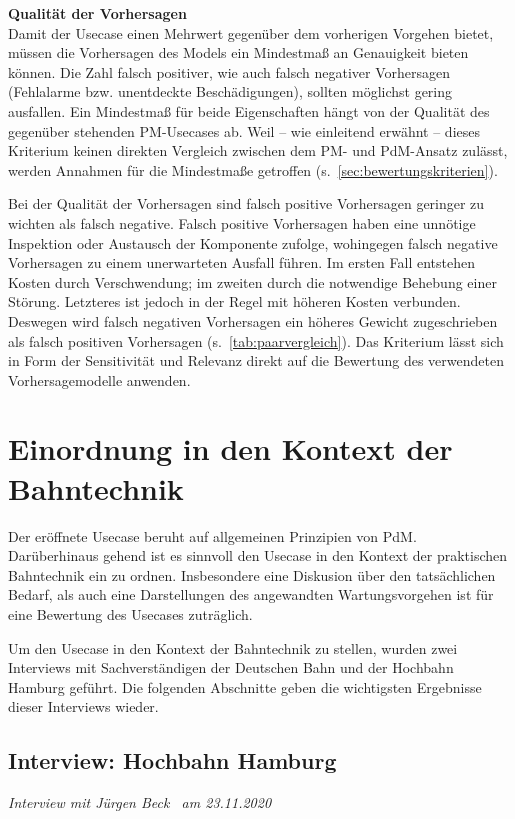 \textbf{Qualität der Vorhersagen}\\
Damit der Usecase einen Mehrwert gegenüber dem vorherigen Vorgehen bietet, müssen die Vorhersagen des Models ein Mindestmaß an Genauigkeit bieten können. Die Zahl falsch positiver, wie auch falsch negativer Vorhersagen (Fehlalarme bzw. unentdeckte Beschädigungen), sollten möglichst gering ausfallen. Ein Mindestmaß für beide Eigenschaften hängt von der Qualität des gegenüber stehenden PM-Usecases ab. Weil -- wie einleitend erwähnt -- dieses Kriterium keinen direkten Vergleich zwischen dem PM- und PdM-Ansatz zulässt, werden Annahmen für die Mindestmaße getroffen (s.~\cref{sec:bewertungskriterien}).

Bei der Qualität der Vorhersagen sind falsch positive Vorhersagen geringer zu wichten als falsch negative. Falsch positive Vorhersagen haben eine unnötige Inspektion oder Austausch der Komponente zufolge, wohingegen falsch negative Vorhersagen zu einem unerwarteten Ausfall führen. Im ersten Fall entstehen Kosten durch Verschwendung; im zweiten durch die notwendige Behebung einer Störung. Letzteres ist jedoch in der Regel mit höheren Kosten verbunden. Deswegen wird falsch negativen Vorhersagen ein höheres Gewicht zugeschrieben als falsch positiven Vorhersagen (s.~\cref{tab:paarvergleich}). Das Kriterium lässt sich in Form der Sensitivität und Relevanz direkt auf die Bewertung des verwendeten Vorhersagemodelle anwenden.
\section{Einordnung in den Kontext der Bahntechnik}
\label{sec:kontext_bahntechnik_von_usecase}
Der eröffnete Usecase beruht auf allgemeinen Prinzipien von PdM. Darüberhinaus gehend ist es sinnvoll den Usecase in den Kontext der praktischen Bahntechnik ein zu ordnen. Insbesondere eine Diskusion über den tatsächlichen Bedarf, als auch eine Darstellungen des angewandten Wartungsvorgehen ist für eine Bewertung des Usecases zuträglich.

Um den Usecase in den Kontext der Bahntechnik zu stellen, wurden zwei Interviews mit Sachverständigen der Deutschen Bahn und der Hochbahn Hamburg geführt. Die folgenden Abschnitte geben die wichtigsten Ergebnisse dieser Interviews wieder.
\subsection{Interview: Hochbahn Hamburg}
\label{subsec:interview_hochbahn}
\textit{Interview mit Jürgen Beck~\cite{hochbahn.2020} am {23.11.2020}}

